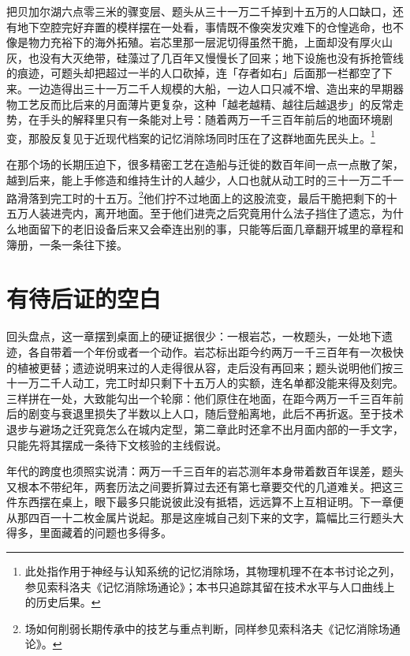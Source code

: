 把贝加尔湖六点零三米的骤变层、题头从三十一万二千掉到十五万的人口缺口，还有地下空腔完好弃置的模样摆在一处看，事情既不像突发灾难下的仓惶逃命，也不像是物力充裕下的海外拓殖。岩芯里那一层泥切得虽然干脆，上面却没有厚火山灰，也没有大灭绝带，硅藻过了几百年又慢慢长了回来；地下设施也没有拆抢管线的痕迹，可题头却把超过一半的人口砍掉，连「存者如右」后面那一栏都空了下来。一边造得出三十一万二千人规模的大船，一边人口只减不增、造出来的早期器物工艺反而比后来的月面薄片更复杂，这种「越老越精、越往后越退步」的反常走势，在手头的解释里只有一条能对上号：随着两万一千三百年前后的地面环境剧变，那股反复见于近现代档案的记忆消除场同时压在了这群地面先民头上。\footnote{此处指作用于神经与认知系统的记忆消除场，其物理机理不在本书讨论之列，参见索科洛夫《记忆消除场通论》；本书只追踪其留在技术水平与人口曲线上的历史后果。}

在那个场的长期压迫下，很多精密工艺在造船与迁徙的数百年间一点一点散了架，越到后来，能上手修造和维持生计的人越少，人口也就从动工时的三十一万二千一路滑落到完工时的十五万。\footnote{场如何削弱长期传承中的技艺与重点判断，同样参见索科洛夫《记忆消除场通论》。}他们拧不过地面上的这股流变，最后干脆把剩下的十五万人装进壳内，离开地面。至于他们进壳之后究竟用什么法子挡住了遗忘，为什么地面留下的老旧设备后来又会牵连出别的事，只能等后面几章翻开城里的章程和簿册，一条一条往下接。

\section{有待后证的空白}

回头盘点，这一章摆到桌面上的硬证据很少：一根岩芯，一枚题头，一处地下遗迹，各自带着一个年份或者一个动作。岩芯标出距今约两万一千三百年有一次极快的植被更替；遗迹说明来过的人走得很从容，走后没有再回来；题头说明他们按三十一万二千人动工，完工时却只剩下十五万人的实额，连名单都没能来得及刻完。三样拼在一处，大致能勾出一个轮廓：他们原住在地面，在距今两万一千三百年前后的剧变与衰退里损失了半数以上人口，随后登船离地，此后不再折返。至于技术退步与避场之迁究竟怎么在城内定型，第二章此时还拿不出月面内部的一手文字，只能先将其摆成一条待下文核验的主线假说。

年代的跨度也须照实说清：两万一千三百年的岩芯测年本身带着数百年误差，题头又根本不带纪年，两套历法之间要折算过去还有第七章要交代的几道难关。把这三件东西摆在桌上，眼下最多只能说彼此没有抵牾，远远算不上互相证明。下一章便从那四百一十二枚金属片说起。那是这座城自己刻下来的文字，篇幅比三行题头大得多，里面藏着的问题也多得多。
